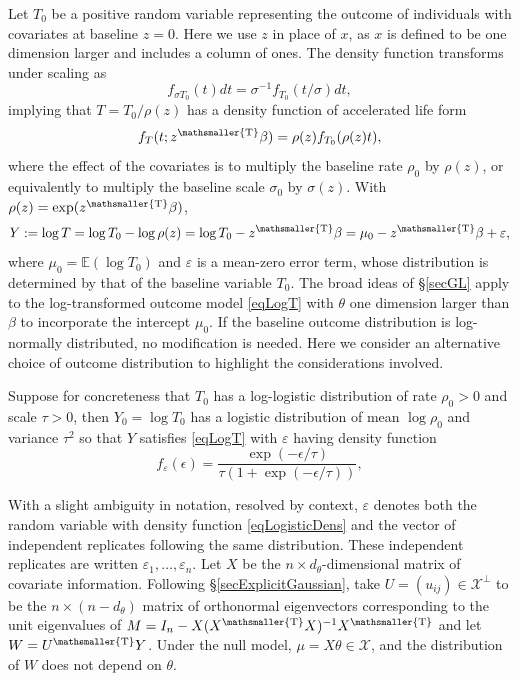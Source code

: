 \documentclass[10pt, reqno]{amsart}
\numberwithin{equation}{section}
\newcommand{\EE}{\mathbb{E}}
\newcommand{\T}{{\mathsmaller {\rm T}}}
\begin{document}
Let $T_0$ be a positive random variable representing the outcome of individuals with covariates at baseline $z=0$. Here we use $z$ in place of $x$, as $x$ is defined to be one dimension larger and includes a column of ones. The density function transforms under scaling as
\[
f_{\sigma T_0}(t)dt = \sigma^{-1}f_{T_0}(t/\sigma)dt,
\]
implying that $T=T_0/\rho(z)$ has a density function of accelerated life form
\[
f_T(t;z^\T\beta)=\rho(z) f_{T_0}(\rho(z)t),
\]
where the effect of the covariates is to multiply the baseline rate $\rho_0$ by $\rho(z)$, or equivalently to multiply the baseline scale $\sigma_0$ by $\sigma(z)$. With $\rho(z)=\exp(z^\T\beta)$,
%
\begin{equation}\label{eqLogT}
	Y:=\log T = \log T_0 - \log \rho(z) = \log T_0 - z^\T\beta = \mu_0 - z^\T\beta +\varepsilon,
\end{equation}
%
where $\mu_0 = \EE(\log T_0)$ and $\varepsilon$ is a mean-zero error term, whose distribution is determined by that of the baseline variable $T_0$. The broad ideas of \S \ref{secGL} apply to the log-transformed outcome model \eqref{eqLogT} with $\theta$ one dimension larger than $\beta$ to incorporate the intercept $\mu_0$. If the baseline outcome distribution is log-normally distributed, no modification is needed. Here we consider an alternative choice of outcome distribution to highlight the considerations involved.

Suppose for concreteness that $T_0$ has a log-logistic distribution of rate $\rho_0>0$ and scale $\tau>0$, then $Y_0 = \log T_0$ has a logistic distribution of mean $\log \rho_0$ and variance $\tau^2$ so that $Y$ satisfies \eqref{eqLogT} with $\varepsilon$ having density function 
%
\begin{equation}\label{eqLogisticDens}
	f_{\varepsilon}(\epsilon)=\frac{\exp(-\epsilon/\tau)}{\tau(1+\exp(-\epsilon/\tau))},
\end{equation}

With a slight ambiguity in notation, resolved by context, $\varepsilon$ denotes both the random variable with density function \eqref{eqLogisticDens} and the vector of independent replicates following the same distribution. These independent replicates are written $\varepsilon_{1},\ldots, \varepsilon_{n}$. Let $X$ be the $n\times d_\theta$-dimensional matrix of covariate information. Following \S\ref{secExplicitGaussian}, take $U = (u_{ij})\in \mathcal{X}^\perp$ to be the $n\times (n-d_\theta)$ matrix of orthonormal eigenvectors corresponding to the unit eigenvalues of $M=I_n - X(X^\T X)^{-1}X^\T$ and let $W=U^\T Y$. Under the null model, $\mu=X\theta \in \mathcal{X}$, and the distribution of $W$ does not depend on $\theta$. 
\end{document}
